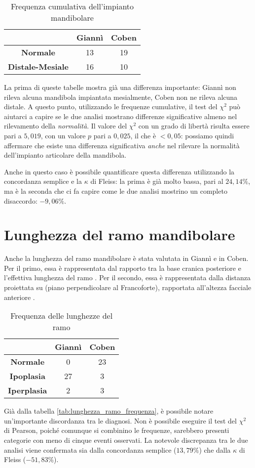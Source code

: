\begin{table}[ht]
\centering
\caption{Frequenza cumulativa dell'impianto mandibolare}
\label{tab:impianto_mandibolare_frequenze_cumulative}
\begin{tabular}{>{\bfseries}ccc}
\toprule
 & \textbf{Giannì} & \textbf{Coben} \\
\midrule
Normale & 13 & 19 \\
Distale-Mesiale & 16 & 10 \\
\bottomrule
\end{tabular}
\end{table}

La prima di queste tabelle mostra già una differenza importante: Giannì non rileva alcuna mandibola impiantata mesialmente, Coben non ne rileva alcuna distale. A questo punto, utilizzando le frequenze cumulative, il test del $\chi^2$ può aiutarci a capire se le due analisi mostrano differenze significative almeno nel rilevamento della \emph{normalità}. Il valore del $\chi^2$ con un grado di libertà risulta essere pari a $5,019$, con un valore $p$ pari a $0,025$, il che è $< 0,05$: possiamo quindi affermare che esiste una differenza significativa \emph{anche} nel rilevare la normalità dell'impianto articolare della mandibola.

Anche in questo caso è possibile quantificare questa differenza utilizzando la concordanza semplice e la $\kappa$ di Fleiss: la prima è già molto bassa, pari al $24,14\%$, ma è la seconda che ci fa capire come le due analisi mostrino un completo disaccordo: $-9,06\%$.

\section{Lunghezza del ramo mandibolare}
Anche la lunghezza del ramo mandibolare è stata valutata in Giannì e in Coben. Per il primo, essa è rappresentata dal rapporto tra la base cranica posteriore  e l'effettiva lunghezza del ramo . Per il secondo, essa è rappresentata dalla distanza  proiettata su  (piano perpendicolare al Francoforte), rapportata all'altezza facciale anteriore .

\begin{table}[bh]
\centering
\caption{Frequenza delle lunghezze del ramo}
\label{tab:lunghezza_ramo_frequenza}
\begin{tabular}{>{\bfseries}ccc}
\toprule
 & \textbf{Giannì} & \textbf{Coben} \\
\midrule
Normale & 0 & 23 \\
Ipoplasia & 27 & 3 \\
Iperplasia & 2 & 3 \\
\bottomrule
\end{tabular}
\end{table}

Già dalla tabella \vref{tab:lunghezza_ramo_frequenza}, è possibile notare un'importante discordanza tra le diagnosi. Non è possibile eseguire il test del $\chi^2$ di Pearson, poiché comunque si combinino le frequenze, sarebbero presenti categorie con meno di cinque eventi osservati. La notevole discrepanza tra le due analisi viene confermata sia dalla concordanza semplice ($13,79\%$) che dalla $\kappa$ di Fleiss ($-51,83\%$).
